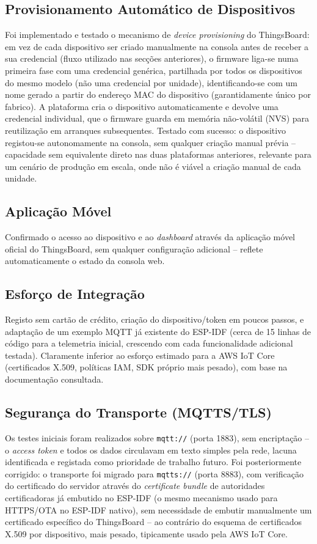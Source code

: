 \documentclass[a4paper,12pt]{article}
\begin{document}
\subsection{Provisionamento Automático de Dispositivos}
Foi implementado e testado o mecanismo de \textit{device provisioning} do ThingsBoard: em vez de cada dispositivo ser criado manualmente na consola antes de receber a sua credencial (fluxo utilizado nas secções anteriores), o firmware liga-se numa primeira fase com uma credencial genérica, partilhada por todos os dispositivos do mesmo modelo (não uma credencial por unidade), identificando-se com um nome gerado a partir do endereço MAC do dispositivo (garantidamente único por fabrico). A plataforma cria o dispositivo automaticamente e devolve uma credencial individual, que o firmware guarda em memória não-volátil (NVS) para reutilização em arranques subsequentes. Testado com sucesso: o dispositivo registou-se autonomamente na consola, sem qualquer criação manual prévia -- capacidade sem equivalente direto nas duas plataformas anteriores, relevante para um cenário de produção em escala, onde não é viável a criação manual de cada unidade.

\subsection{Aplicação Móvel}
Confirmado o acesso ao dispositivo e ao \textit{dashboard} através da aplicação móvel oficial do ThingsBoard, sem qualquer configuração adicional -- reflete automaticamente o estado da consola web.

\subsection{Esforço de Integração}
Registo sem cartão de crédito, criação do dispositivo/token em poucos passos, e adaptação de um exemplo MQTT já existente do ESP-IDF (cerca de 15 linhas de código para a telemetria inicial, crescendo com cada funcionalidade adicional testada). Claramente inferior ao esforço estimado para a AWS IoT Core (certificados X.509, políticas IAM, SDK próprio mais pesado), com base na documentação consultada.

\subsection{Segurança do Transporte (MQTTS/TLS)}
Os testes iniciais foram realizados sobre \texttt{mqtt://} (porta 1883), sem encriptação -- o \textit{access token} e todos os dados circulavam em texto simples pela rede, lacuna identificada e registada como prioridade de trabalho futuro. Foi posteriormente corrigido: o transporte foi migrado para \texttt{mqtts://} (porta 8883), com verificação do certificado do servidor através do \textit{certificate bundle} de autoridades certificadoras já embutido no ESP-IDF (o mesmo mecanismo usado para HTTPS/OTA no ESP-IDF nativo), sem necessidade de embutir manualmente um certificado específico do ThingsBoard -- ao contrário do esquema de certificados X.509 por dispositivo, mais pesado, tipicamente usado pela AWS IoT Core.
\end{document}
